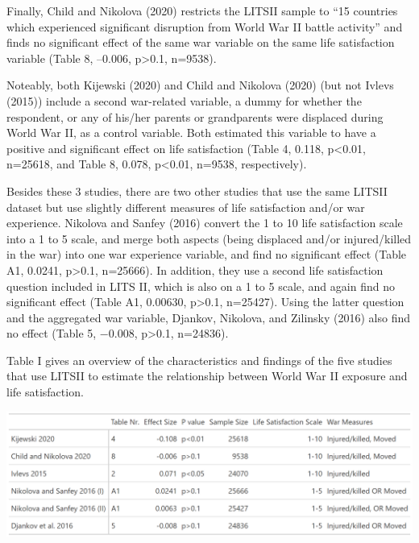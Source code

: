 \documentclass[
  letterpaper,
  DIV=11,
  numbers=noendperiod]{scrartcl}
\begin{document}
Finally, Child and Nikolova (2020) restricts the LITSII sample to ``15
countries which experienced significant disruption from World War II
battle activity'' and finds no significant effect of the same war
variable on the same life satisfaction variable (Table 8, --0.006,
p\textgreater0.1, n=9538).

Noteably, both Kijewski (2020) and Child and Nikolova (2020) (but not
Ivlevs (2015)) include a second war-related variable, a dummy for
whether the respondent, or any of his/her parents or grandparents were
displaced during World War II, as a control variable. Both estimated
this variable to have a positive and significant effect on life
satisfaction (Table 4, 0.118, p\textless0.01, n=25618, and Table 8,
0.078, p\textless0.01, n=9538, respectively).

Besides these 3 studies, there are two other studies that use the same
LITSII dataset but use slightly different measures of life satisfaction
and/or war experience. Nikolova and Sanfey (2016) convert the 1 to 10
life satisfaction scale into a 1 to 5 scale, and merge both aspects
(being displaced and/or injured/killed in the war) into one war
experience variable, and find no significant effect (Table A1, 0.0241,
p\textgreater0.1, n=25666). In addition, they use a second life
satisfaction question included in LITS II, which is also on a 1 to 5
scale, and again find no significant effect (Table A1, 0.00630,
p\textgreater0.1, n=25427). Using the latter question and the aggregated
war variable, Djankov, Nikolova, and Zilinsky (2016) also find no effect
(Table 5, −0.008, p\textgreater0.1, n=24836).

Table I gives an overview of the characteristics and findings of the
five studies that use LITSII to estimate the relationship between World
War II exposure and life satisfaction.

\includegraphics{tab_1.png}
\end{document}
